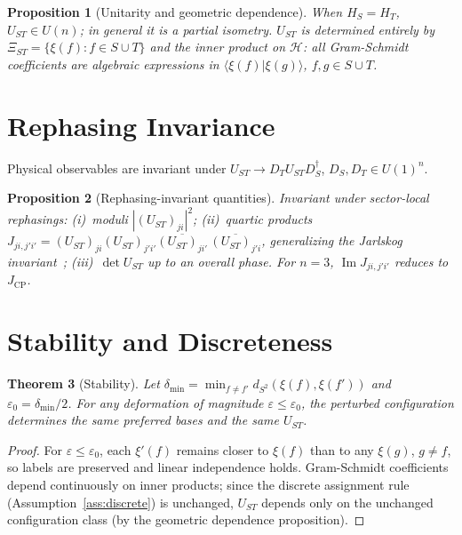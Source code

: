 \documentclass[11pt,a4paper]{article}
\newtheorem{theorem}{Theorem}
\newtheorem{proposition}[theorem]{Proposition}
\begin{document}
\begin{proposition}[Unitarity and geometric dependence]
When $H_S=H_T$, $U_{ST}\in U(n)$; in general it is a partial isometry.
$U_{ST}$ is determined entirely by $\Xi_{ST}=\{\xi(f):f\in S\cup T\}$
and the inner product on $\mathcal{H}$: all Gram-Schmidt coefficients
are algebraic expressions in $\langle\xi(f)|\xi(g)\rangle$,
$f,g\in S\cup T$.
\end{proposition}

\section{Rephasing Invariance}
\label{sec:rephasing}

Physical observables are invariant under $U_{ST}\to D_T U_{ST}D_S^\dagger$,
$D_S,D_T\in U(1)^n$.

\begin{proposition}[Rephasing-invariant quantities]
Invariant under sector-local rephasings:
(i)~moduli $|(U_{ST})_{ji}|^2$;
(ii)~quartic products
$J_{ji,j'i'}=(U_{ST})_{ji}(U_{ST})_{j'i'}\overline{(U_{ST})_{ji'}}\,
\overline{(U_{ST})_{j'i}}$,
generalizing the Jarlskog invariant~\cite{Jarlskog};
(iii)~$\det U_{ST}$ up to an overall phase.
For $n=3$, $\operatorname{Im}J_{ji,j'i'}$ reduces to $J_{\mathrm{CP}}$.
\end{proposition}

\section{Stability and Discreteness}
\label{sec:stability}

\begin{theorem}[Stability]
\label{thm:stability}
Let $\delta_{\min}=\min_{f\neq f'}d_{S^2}(\xi(f),\xi(f'))$ and
$\varepsilon_0=\delta_{\min}/2$.
For any deformation of magnitude $\varepsilon\leq\varepsilon_0$,
the perturbed configuration determines the same preferred bases and
the same $U_{ST}$.
\end{theorem}

\begin{proof}
For $\varepsilon\leq\varepsilon_0$, each $\xi'(f)$ remains closer to
$\xi(f)$ than to any $\xi(g)$, $g\neq f$, so labels are preserved
and linear independence holds.
Gram-Schmidt coefficients depend continuously on inner products;
since the discrete assignment rule (Assumption~\ref{ass:discrete})
is unchanged, $U_{ST}$ depends only on the unchanged configuration
class (by the geometric dependence proposition).
\end{proof}
\end{document}
